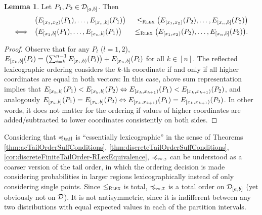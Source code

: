 \documentclass[a4paper]{scrreprt}
\theoremstyle{definition}
\newtheorem{lemma}[thm]{Lemma} %
\begin{document}
    \begin{lemma}
        Let $P_1, P_2 \in \mathcal{D}_{[a, b]}$.
        Then
        \begin{alignat*}{3}
                                     &\bigl(E_{[x_1, x_2)}(P_{1}), \dots, E_{[x_n, b]}(P_1)\bigr)\; &\leq_{\textsc{Rlex}} \bigl(E_{[x_1, x_2)}(P_2), \dots, E_{[x_n, b]}(P_2)\bigr) \\
            \Longleftrightarrow\quad &\bigl(E_{[x_1, b]}(P_{1}), \dots, E_{[x_n, b]}(P_1)\bigr) &\leq_{\textsc{Rlex}} \bigl(E_{[x_1, x_2)}(P_2), \dots, E_{[x_n, b]}(P_2)\bigr).
        \end{alignat*}
    \end{lemma}
    \begin{proof}
        Observe that for any $P_l$ ($l = 1, 2$), $E_{[x_k, b]}(P_l) = \bigl(\sum_{i=k}^{n-1} E_{[x_i, b)}(P_l)\bigr) + E_{[x_n, b]}(P_l)$ for all $k \in [n]$.
        The reflected lexicographic ordering considers the $k$-th coordinate if and only if all higher coordinates are equal in both vectors:
        In this case, above sum representation implies that $E_{[x_k, b]}(P_1) < E_{[x_k, b]}(P_2) \Leftrightarrow E_{[x_k, x_{k+1})}(P_1) < E_{[x_k, x_{k+1})}(P_2)$, and analogously $E_{[x_k, b]}(P_1) = E_{[x_k, b]}(P_2) \Leftrightarrow E_{[x_k, x_{k+1})}(P_1) = E_{[x_k, x_{k+1})}(P_2)$.
        In other words, it does not matter for the ordering if values of higher coordinates are added/subtracted to lower coordinates consistently on both sides.
    \end{proof}

    Considering that $\preccurlyeq_{\text{tail}}$ is “essentially lexicographic” in the sense of Theorems \ref{thm:acTailOrderSuffConditions}, \ref{thm:discreteTailOrderSuffConditions}, \ref{cor:discreteFiniteTailOrder-RLexEquivalence},
    $\leqtw$ can be understood as a coarser version of the tail order, in which the ordering decision is made considering probabilities in larger regions lexicographically instead of only considering single points.
    Since $\leq_{\textsc{Rlex}}$ is total, $\leqtw$ is a total order on $\mathcal{D}_{[a, b]}$ (yet obviously not on $\mathcal{D}$). It is not antisymmetric, since it is indifferent between any two distributions with equal expected values in each of the partition intervals.
    
\end{document}
